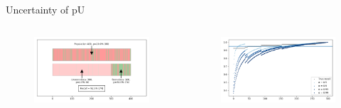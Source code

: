 \documentclass[9pt]{beamer}
\begin{document}
\begin{frame}{Uncertainty of pU}

\begin{columns}
	\begin{column}{0.5\linewidth}
		\begin{figure}
			\includegraphics[width=\linewidth]{../images/sample_status.png}
		\end{figure}
	\end{column}
	\begin{column}{0.5\linewidth}
		\begin{figure}
			\includegraphics[width=\linewidth]{../images/sample_recall.png}
		\end{figure}
	\end{column}
\end{columns}

\end{frame}
\end{document}
